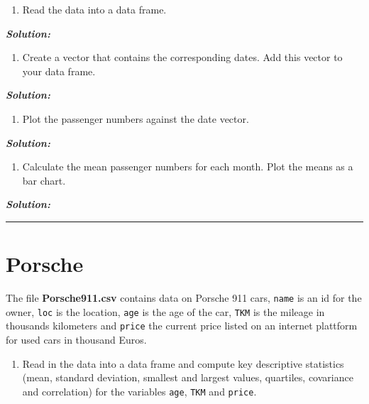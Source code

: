 \documentclass[]{article}
\providecommand{\tightlist}{%
  \setlength{\itemsep}{0pt}\setlength{\parskip}{0pt}}
\begin{document}
\begin{enumerate}
\def\labelenumi{\arabic{enumi}.}
\tightlist
\item
  Read the data into a data frame.
\end{enumerate}

\textbf{\emph{Solution:}}

\begin{enumerate}
\def\labelenumi{\arabic{enumi}.}
\setcounter{enumi}{1}
\tightlist
\item
  Create a vector that contains the corresponding dates. Add this vector
  to your data frame.
\end{enumerate}

\textbf{\emph{Solution:}}

\begin{enumerate}
\def\labelenumi{\arabic{enumi}.}
\setcounter{enumi}{2}
\tightlist
\item
  Plot the passenger numbers against the date vector.
\end{enumerate}

\textbf{\emph{Solution:}}

\begin{enumerate}
\def\labelenumi{\arabic{enumi}.}
\setcounter{enumi}{3}
\tightlist
\item
  Calculate the mean passenger numbers for each month. Plot the means as
  a bar chart.
\end{enumerate}

\textbf{\emph{Solution:}}

\pagebreak

\begin{center}\rule{0.5\linewidth}{\linethickness}\end{center}

\section{Porsche}\label{porsche}

The file \textbf{Porsche911.csv} contains data on Porsche 911 cars,
\texttt{name} is an id for the owner, \texttt{loc} is the location,
\texttt{age} is the age of the car, \texttt{TKM} is the mileage in
thousands kilometers and \texttt{price} the current price listed on an
internet plattform for used cars in thousand Euros.

\begin{enumerate}
\def\labelenumi{\arabic{enumi}.}
\tightlist
\item
  Read in the data into a data frame and compute key descriptive
  statistics (mean, standard deviation, smallest and largest values,
  quartiles, covariance and correlation) for the variables \texttt{age},
  \texttt{TKM} and \texttt{price}.
\end{enumerate}
\end{document}
